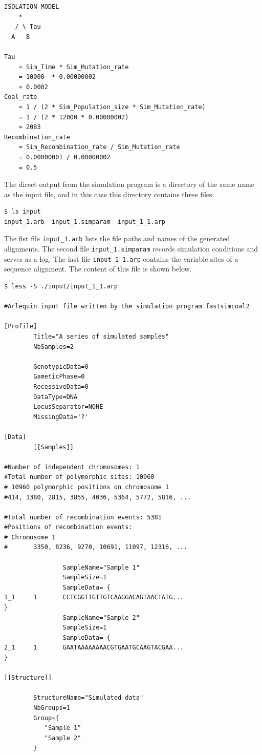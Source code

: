 \documentclass[graybox]{svmult}
\begin{document}
 {\scriptsize{}\begin{verbatim}
ISOLATION MODEL
    *
   / \ Tau
  A   B

Tau
    = Sim_Time * Sim_Mutation_rate
    = 10000  * 0.00000002
    = 0.0002
Coal_rate
    = 1 / (2 * Sim_Population_size * Sim_Mutation_rate)
    = 1 / (2 * 12000 * 0.00000002)
    = 2083
Recombination_rate
    = Sim_Recombination_rate / Sim_Mutation_rate
    = 0.00000001 / 0.00000002
    = 0.5
\end{verbatim}}

The direct output from the simulation program is a directory of the same name as the input file, and in this case this directory contains three files:

 {\scriptsize{}\begin{verbatim}
$ ls input
input_1.arb  input_1.simparam  input_1_1.arp
\end{verbatim}}

The fist file \texttt{input\_1.arb} lists the file paths and names of the generated alignments.  The second file \texttt{input\_1.simparam} records simulation conditions and serves as a log.  The last file \texttt{input\_1\_1.arp} contains the variable sites of a sequence alignment.  The content of this file is shown below.

 {\scriptsize{}\begin{verbatim}
$ less -S ./input/input_1_1.arp

#Arlequin input file written by the simulation program fastsimcoal2

[Profile]
        Title="A series of simulated samples"
        NbSamples=2

        GenotypicData=0
        GameticPhase=0
        RecessiveData=0
        DataType=DNA
        LocusSeparator=NONE
        MissingData='?'

[Data]
        [[Samples]]

#Number of independent chromosomes: 1
#Total number of polymorphic sites: 10960
# 10960 polymorphic positions on chromosome 1
#414, 1380, 2815, 3855, 4036, 5364, 5772, 5816, ...

#Total number of recombination events: 5381
#Positions of recombination events:
# Chromosome 1
#       3350, 8236, 9270, 10691, 11097, 12316, ...

                SampleName="Sample 1"
                SampleSize=1
                SampleData= {
1_1     1       CCTCGGTTGTTGTCAAGGACAGTAACTATG...
}
                SampleName="Sample 2"
                SampleSize=1
                SampleData= {
2_1     1       GAATAAAAAAAACGTGAATGCAAGTACGAA...
}

[[Structure]]

        StructureName="Simulated data"
        NbGroups=1
        Group={
           "Sample 1"
           "Sample 2"
        }
\end{verbatim}}
\end{document}
